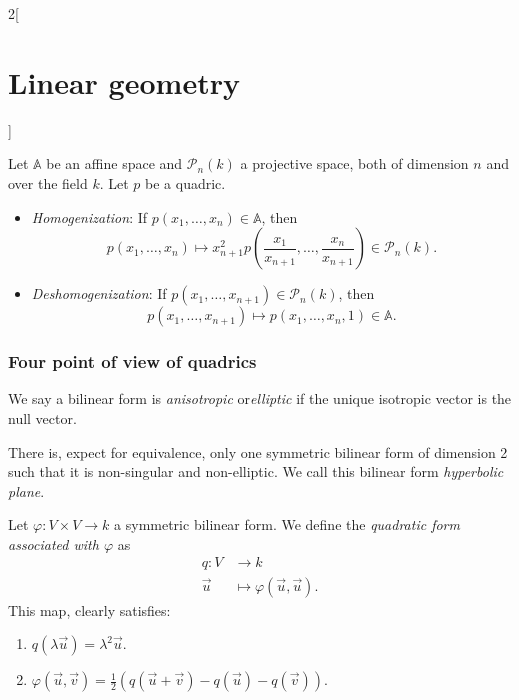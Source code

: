 \documentclass[class=article,10pt,crop=false]{standalone}
\begin{document}
\begin{multicols}{2}[\section{Linear geometry}]
\begin{theorem}
\end{theorem}
\begin{prop}
Let $\mathbb{A}$ be an affine space and $\mathcal{P}_n(k)$ a projective space, both of dimension $n$ and over the field $k$. Let $p$ be a quadric. 
\begin{itemize}
    \item\textit{Homogenization}: If $p(x_1,\ldots,x_n)\in\mathbb{A}$, then $$p(x_1,\ldots,x_n)\mapsto x_{n+1}^2p\left(\frac{x_1}{x_{n+1}},\ldots,\frac{x_n}{x_{n+1}}\right)\in\mathcal{P}_n(k).$$
    \item\textit{Deshomogenization}: If $p(x_1,\ldots,x_{n+1})\in\mathcal{P}_n(k)$, then $$p(x_1,\ldots,x_{n+1})\mapsto p(x_1,\ldots,x_n,1)\in\mathbb{A}.$$
\end{itemize}
\end{prop}
\subsubsection*{Four point of view of quadrics}
\begin{definition}
We say a bilinear form is \textit{anisotropic} or\textit{elliptic} if the unique isotropic vector is the null vector.
\end{definition}
\begin{theorem}
There is, expect for equivalence, only one symmetric bilinear form of dimension 2 such that it is non-singular and non-elliptic. We call this bilinear form \textit{hyperbolic plane}.
\end{theorem}
\begin{definition}
Let $\varphi:V\times V\rightarrow k$ a symmetric bilinear form. We define the \textit{quadratic form associated with $\varphi$} as 
\begin{align*}
    q:V&\rightarrow k\\
    \overrightarrow{u}&\mapsto\varphi(\overrightarrow{u},\overrightarrow{u}).
\end{align*} This map, clearly satisfies:
\begin{enumerate}
    \item $q(\lambda\overrightarrow{u})=\lambda^2\overrightarrow{u}$.
    \item $\displaystyle\varphi(\overrightarrow{u},\overrightarrow{v})=\frac{1}{2}\left(q(\overrightarrow{u}+\overrightarrow{v})-q(\overrightarrow{u})-q(\overrightarrow{v})\right)$.
\end{enumerate}
\end{definition}
\begin{prop}

\end{prop}
\end{multicols}
\end{document}
